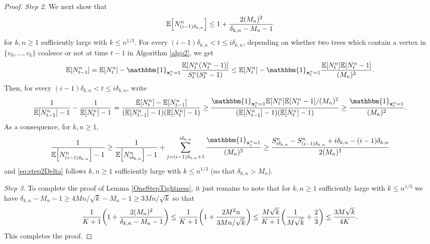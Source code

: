 \documentclass[11pt]{article}
\theoremstyle{plain}
\theoremstyle{definition}
\theoremstyle{remark}
\newcommand{\E}{\mathbb{E}} %
\newcommand{\1}{\mathbbm{1}} %
\newcommand{\esp}[1]{\mathbb{E}\left[#1\right]} %
\newcommand{\Xb}{\mathrm{\mathbf{x}}} %
\let\originalleft\left
\let\originalright\right
\renewcommand{\left}{\mathopen{}\mathclose\bgroup\originalleft}
\renewcommand{\right}{\aftergroup\egroup\originalright}
\begin{document}
\begin{proof}
\emph{Step 2.} We next show that
\begin{equation}
\label{eq:step2Delta}  \esp{N^{n}_{ (i-1) \delta_{k,n}  }} \leq 1+\frac{2(M_{n})^2}{\delta_{k,n}-M_{n}-1}
\end{equation}
for $k,n \geq 1$ sufficiently large with $k \leq n^{1/3}$.
For every $ (i-1) \delta_{k,n}   {<} t {\leq} i \delta_{k,n} $, depending on whether two trees which contain a vertex in $\{v_0,\dots, v_{k}\}$ coalesce or not at time $t-1$ in Algorithm \ref{algo2}, we get
\[
 \E[N_{t-1}^n]  = \E[N_{t}^n]-\1_{\Xb^n_t=1} \frac{\E[N_{t}^n(N_{t}^n-1)]}{S^n_t(S^n_t-1)}  \leq \E[N_{t}^n]-\1_{\Xb^n_t=1} \frac{\E[N_{t}^n]\E[ N_{t}^n-1]}{(M_{n})^2}.
\]
Then, for every  $ (i-1) \delta_{k,n}    {<}  t  {\leq}  i \delta_{k,n} $, write
\[
\frac{1}{\E[N_{t-1}^n]-1}-\frac{1}{\E[N_{t}^n]-1} = \frac{\E[N_{t}^n]-\E[N_{t-1}^n]}{(\E[N_{t-1}^n]-1)(\E[N_{t}^n]-1)} \geq  
\frac{\1_{\Xb^n_t=1}\E[N_{t}^n]\E[ N_{t}^n-1]/(M_{n})^2}{(\E[N_{t-1}^n]-1)(\E[N_{t}^n]-1)} \geq \frac{\1_{\Xb^n_t=1}}{(M_{n})^2}.
\]
As a consequence, for $k,n \geq 1$,
\[
\frac{1}{\E\left [N_{(i-1) \delta_{k,n} }^n \right ]-1} \geq  \frac{1}{\E\left [N^n_{ i \delta_{k,n} } \right ]-1 }+\sum_{j=(i-1) \delta_{k,n}+1}^{ i \delta_{k,n} } \frac{\1_{\Xb^{n}_j=1}}{(M_{n})^2} \geq  \frac{S^{n}_{ i \delta_{k,n} }-S^{n}_{ (i-1 )\delta_{k,n} }+ i \delta_{k,n} - (i-1) \delta_{k,n} }{2(M_{n})^2}
\]
and \eqref{eq:step2Delta} follows $k,n \geq 1$ sufficiently large with $k \leq n^{1/3}$ (so that $\delta_{k,n}> M_{n}$).


\emph{Step 3.}  To complete the proof of Lemma \ref{OneStepTightness}, it just remains to note that for $k,n \geq 1$ sufficiently large with  $k\leq n^{1/3}$ we have $\delta_{k,n}-M_n-1\geq 4Mn/\sqrt{k}-M_n-1\geq 3 Mn/\sqrt{k}$ so that
\[
 \frac{1}{K+1} \left( 1+\frac{2(M_{n})^2}{\delta_{k,n}-M_{n}-1} \right) \leq  \frac{1}{K+1} \left( 1+\frac{2 M^{2} n}{3Mn/\sqrt{k}} \right)  \leq \frac{M\sqrt{k}}{K+1} \left( \frac{1}{M\sqrt{k}}+ \frac{2}{3} \right)\leq \frac{3 M\sqrt{k}}{4K}.
\]
This completes the proof.
\end{proof} 
\end{document}
